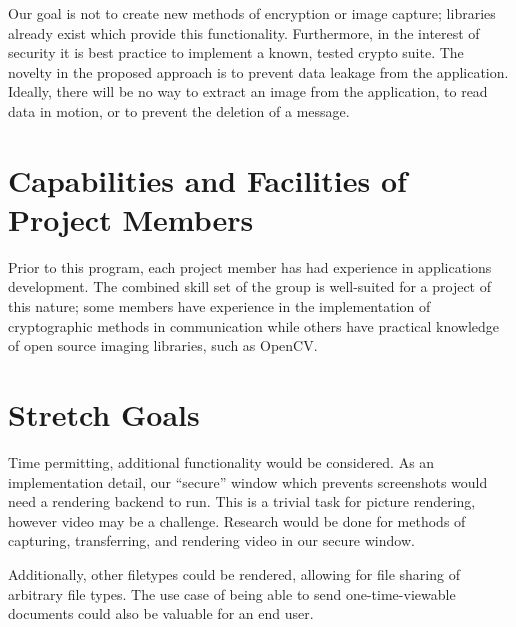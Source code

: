 \documentclass[11pt, oneside]{article}
\begin{document}
\begin{comment}
The application would present to the user a method of capturing or selecting an image to send to another user. The user would then be prompted for the ``destination-user'', who upon receiving the image would be able to see the image for some set amount of time. After the message is viewed, the message deletes itself. The custom-built viewer window displayed on the screen to view the message would be made to prevent screenshots. All transmissions would be encrypted using an as-yet-to-be-determined crypto scheme. 
\end{comment}

\newpage
Our goal is not to create new methods of encryption or image capture; libraries already exist which provide this functionality. Furthermore, in the interest of security it is best practice to implement a known, tested crypto suite. The novelty in the proposed approach is to prevent data leakage from the application. Ideally, there will be no way to extract an image from the application, to read data in motion, or to prevent the deletion of a message. 

\section{Capabilities and Facilities of Project Members}
Prior to this program, each project member has had experience in applications development. The combined skill set of the group is well-suited for a project of this nature; some members have experience in the implementation of cryptographic methods in communication while others have practical knowledge of open source imaging libraries, such as OpenCV.

\section{Stretch Goals}
Time permitting, additional functionality would be considered. As an implementation detail, our ``secure'' window which prevents screenshots would need a rendering backend to run. This is a trivial task for picture rendering, however video may be a challenge. Research would be done for methods of capturing, transferring, and rendering video in our secure window.

Additionally, other filetypes could be rendered, allowing for file sharing of arbitrary file types. The use case of being able to send one-time-viewable documents could also be valuable for an end user.
\end{document}
